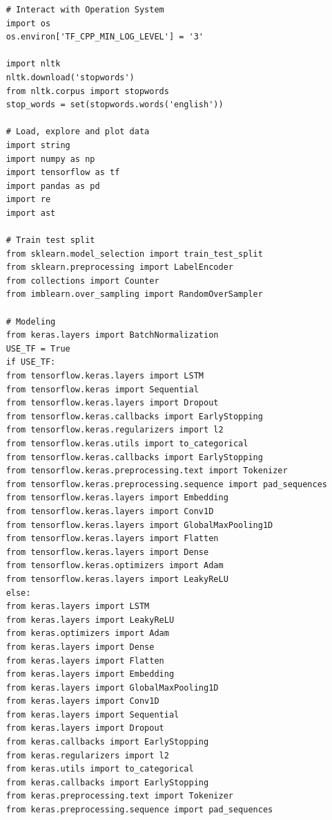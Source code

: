 \begin{lstlisting}
	# Interact with Operation System
	import os
	os.environ['TF_CPP_MIN_LOG_LEVEL'] = '3'
	
	import nltk
	nltk.download('stopwords')
	from nltk.corpus import stopwords
	stop_words = set(stopwords.words('english'))
	
	# Load, explore and plot data
	import string
	import numpy as np
	import tensorflow as tf
	import pandas as pd
	import re
	import ast
	
	# Train test split
	from sklearn.model_selection import train_test_split
	from sklearn.preprocessing import LabelEncoder
	from collections import Counter
	from imblearn.over_sampling import RandomOverSampler
	
	# Modeling
	from keras.layers import BatchNormalization
	USE_TF = True
	if USE_TF:
	from tensorflow.keras.layers import LSTM
	from tensorflow.keras import Sequential
	from tensorflow.keras.layers import Dropout
	from tensorflow.keras.callbacks import EarlyStopping
	from tensorflow.keras.regularizers import l2
	from tensorflow.keras.utils import to_categorical
	from tensorflow.keras.callbacks import EarlyStopping
	from tensorflow.keras.preprocessing.text import Tokenizer
	from tensorflow.keras.preprocessing.sequence import pad_sequences
	from tensorflow.keras.layers import Embedding
	from tensorflow.keras.layers import Conv1D
	from tensorflow.keras.layers import GlobalMaxPooling1D
	from tensorflow.keras.layers import Flatten
	from tensorflow.keras.layers import Dense
	from tensorflow.keras.optimizers import Adam
	from tensorflow.keras.layers import LeakyReLU
	else:
	from keras.layers import LSTM
	from keras.layers import LeakyReLU
	from keras.optimizers import Adam
	from keras.layers import Dense
	from keras.layers import Flatten
	from keras.layers import Embedding
	from keras.layers import GlobalMaxPooling1D
	from keras.layers import Conv1D
	from keras.layers import Sequential
	from keras.layers import Dropout
	from keras.callbacks import EarlyStopping
	from keras.regularizers import l2
	from keras.utils import to_categorical
	from keras.callbacks import EarlyStopping
	from keras.preprocessing.text import Tokenizer
	from keras.preprocessing.sequence import pad_sequences
\end{lstlisting}

